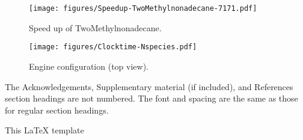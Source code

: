 \begin{figure}[h!]
\centering
\texttt{[image: figures/Speedup-TwoMethylnonadecane-7171.pdf]}
\caption{Speed up of TwoMethylnonadecane.}
\label{f:speedup}
\end{figure}


\begin{figure*}[h!]
\centering
\vspace{-0.4 in}
\texttt{[image: figures/Clocktime-Nspecies.pdf]}
\vspace{10 pt}
\caption{Engine configuration (top view).}
\label{engine_fig}
\end{figure*}


The Acknowledgements, Supplementary material (if included), and References section headings are not numbered. The font and spacing are the same as those for regular section headings.

 \addvspace{10pt}

This LaTeX template
